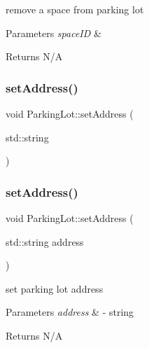 remove a space from parking lot 


\begin{DoxyParams}{Parameters}
{\em space\+ID} & \\
\hline
\end{DoxyParams}
\begin{DoxyReturn}{Returns}
N/A 
\end{DoxyReturn}
\mbox{\label{class_parking_lot_addf77ed29c0befc4ad0ff5cae838fd35}} 
\subsubsection{\texorpdfstring{set\+Address()}{setAddress()}\hspace{0.1cm}{\footnotesize\ttfamily [1/2]}}
{\footnotesize\ttfamily void Parking\+Lot\+::set\+Address (\begin{DoxyParamCaption}\item[{std\+::string}]{ }\end{DoxyParamCaption})}

\mbox{\label{class_parking_lot_addf77ed29c0befc4ad0ff5cae838fd35}} 
\subsubsection{\texorpdfstring{set\+Address()}{setAddress()}\hspace{0.1cm}{\footnotesize\ttfamily [2/2]}}
{\footnotesize\ttfamily void Parking\+Lot\+::set\+Address (\begin{DoxyParamCaption}\item[{std\+::string}]{address }\end{DoxyParamCaption})}



set parking lot address 


\begin{DoxyParams}{Parameters}
{\em address} & -\/ string \\
\hline
\end{DoxyParams}
\begin{DoxyReturn}{Returns}
N/A 
\end{DoxyReturn}
\mbox{\label{class_parking_lot_a1406d44ee8d0dcb0c192176d706b437c}} 
